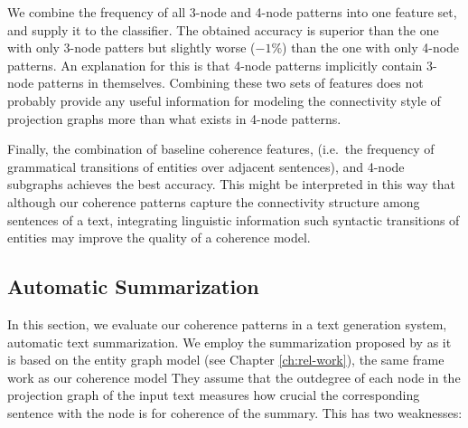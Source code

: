 We combine the frequency of all 3-node and 4-node patterns into one feature set, and supply it to the classifier.   
The obtained accuracy is superior than the one with only 3-node patters but slightly worse  ($-1\%$) than the one with only 4-node patterns. 
An explanation for this is that 4-node patterns implicitly contain 3-node patterns in themselves. 
Combining these two sets of features does not probably provide any useful information for modeling the connectivity style of projection graphs more than what exists in 4-node patterns. 

Finally, the combination of baseline coherence features, (i.e.\ the frequency of grammatical transitions of entities over adjacent sentences), and 4-node subgraphs achieves the best accuracy. 
This might be interpreted in this way that although our coherence patterns capture the connectivity structure among sentences of a text, integrating linguistic information such syntactic transitions of entities may improve the quality of a coherence model.  

\subsection{Automatic Summarization}

In this section, we evaluate our coherence patterns in a text generation system, automatic text summarization. 
We employ the summarization proposed by  as it is based on the entity graph model (see Chapter \ref{ch:rel-work}), the same frame work as our coherence model
They assume that the outdegree of each node in the projection graph of the input text measures how crucial the corresponding sentence with the node is for coherence of the summary.  
This has two weaknesses: 

